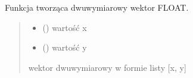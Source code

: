 \documentclass[a4paper,10pt,openany,english]{sphinxmanual}
\begin{document}

\begin{fulllineitems}
\label{\detokenize{js/js-functions:vector2f}}
\pysigstartsignatures
\pysiglinewithargsret
{}
{\sphinxparamcomma {}}
{}
\pysigstopsignatures
\sphinxAtStartPar
Funkcja tworząca dwuwymiarowy wektor FLOAT.
\begin{quote}\begin{description}
\begin{itemize}
\item {} 
\sphinxAtStartPar
{} () \textendash{} wartość x

\item {} 
\sphinxAtStartPar
{} () \textendash{} wartość y

\end{itemize}

\sphinxAtStartPar
wektor dwuwymiarowy w formie listy {[}x, y{]}

\end{description}\end{quote}

\end{fulllineitems}

\end{document}
